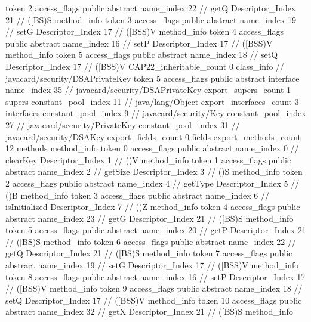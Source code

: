 {{{{{					token	2
					access_flags	public abstract
					name_index	22		// getQ
					Descriptor_Index	21		// ([BS)S
				}
				method_info {
					token	3
					access_flags	public abstract
					name_index	19		// setG
					Descriptor_Index	17		// ([BSS)V
				}
				method_info {
					token	4
					access_flags	public abstract
					name_index	16		// setP
					Descriptor_Index	17		// ([BSS)V
				}
				method_info {
					token	5
					access_flags	public abstract
					name_index	18		// setQ
					Descriptor_Index	17		// ([BSS)V
				}
			}
			CAP22_inheritable_count	0
		}
		class_info {		// javacard/security/DSAPrivateKey
			token	5
			access_flags	public abstract interface
			name_index	35		// javacard/security/DSAPrivateKey
			export_supers_count	1
			supers {
				constant_pool_index	11		// java/lang/Object
			}
			export_interfaces_count	3
			interfaces {
				constant_pool_index	9		// javacard/security/Key
				constant_pool_index	27		// javacard/security/PrivateKey
				constant_pool_index	31		// javacard/security/DSAKey
			}
			export_fields_count	0
			fields {
			}
			export_methods_count	12
			methods {
				method_info {
					token	0
					access_flags	public abstract
					name_index	0		// clearKey
					Descriptor_Index	1		// ()V
				}
				method_info {
					token	1
					access_flags	public abstract
					name_index	2		// getSize
					Descriptor_Index	3		// ()S
				}
				method_info {
					token	2
					access_flags	public abstract
					name_index	4		// getType
					Descriptor_Index	5		// ()B
				}
				method_info {
					token	3
					access_flags	public abstract
					name_index	6		// isInitialized
					Descriptor_Index	7		// ()Z
				}
				method_info {
					token	4
					access_flags	public abstract
					name_index	23		// getG
					Descriptor_Index	21		// ([BS)S
				}
				method_info {
					token	5
					access_flags	public abstract
					name_index	20		// getP
					Descriptor_Index	21		// ([BS)S
				}
				method_info {
					token	6
					access_flags	public abstract
					name_index	22		// getQ
					Descriptor_Index	21		// ([BS)S
				}
				method_info {
					token	7
					access_flags	public abstract
					name_index	19		// setG
					Descriptor_Index	17		// ([BSS)V
				}
				method_info {
					token	8
					access_flags	public abstract
					name_index	16		// setP
					Descriptor_Index	17		// ([BSS)V
				}
				method_info {
					token	9
					access_flags	public abstract
					name_index	18		// setQ
					Descriptor_Index	17		// ([BSS)V
				}
				method_info {
					token	10
					access_flags	public abstract
					name_index	32		// getX
					Descriptor_Index	21		// ([BS)S
				}
				method_info {
}}}}}
